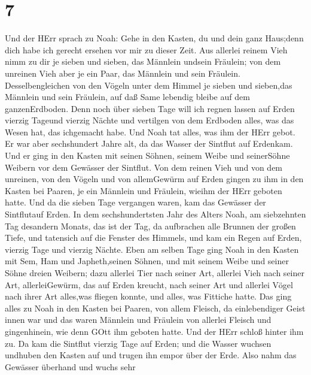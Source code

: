 \hypertarget{section-6}{%
\section{7}\label{section-6}}

 Und der HErr sprach zu Noah: Gehe in den Kasten, du und
dein ganz Haus;denn dich habe ich gerecht ersehen vor mir zu dieser
Zeit.  Aus allerlei reinem Vieh nimm zu dir je sieben und
sieben, das Männlein undsein Fräulein; von dem unreinen Vieh aber je ein
Paar, das Männlein und sein Fräulein.  Desselbengleichen von
den Vögeln unter dem Himmel je sieben und sieben,das Männlein und sein
Fräulein, auf daß Same lebendig bleibe auf dem ganzenErdboden.
 Denn noch über sieben Tage will ich regnen lassen auf Erden
vierzig Tageund vierzig Nächte und vertilgen von dem Erdboden alles, was
das Wesen hat, das ichgemacht habe.  Und Noah tat alles, was
ihm der HErr gebot.  Er war aber sechshundert Jahre alt, da
das Wasser der Sintflut auf Erdenkam.  Und er ging in den
Kasten mit seinen Söhnen, seinem Weibe und seinerSöhne Weibern vor dem
Gewässer der Sintflut.  Von dem reinen Vieh und von dem
unreinen, von den Vögeln und von allemGewürm auf Erden 
gingen zu ihm in den Kasten bei Paaren, je ein Männlein und Fräulein,
wieihm der HErr geboten hatte.  Und da die sieben Tage
vergangen waren, kam das Gewässer der Sintflutauf Erden. 
In dem sechshundertsten Jahr des Alters Noah, am siebzehnten Tag
desandern Monats, das ist der Tag, da aufbrachen alle Brunnen der großen
Tiefe, und tatensich auf die Fenster des Himmels,  und kam
ein Regen auf Erden, vierzig Tage und vierzig Nächte.  Eben
am selben Tage ging Noah in den Kasten mit Sem, Ham und Japheth,seinen
Söhnen, und mit seinem Weibe und seiner Söhne dreien Weibern;
 dazu allerlei Tier nach seiner Art, allerlei Vieh nach
seiner Art, allerleiGewürm, das auf Erden kreucht, nach seiner Art und
allerlei Vögel nach ihrer Art alles,was fliegen konnte, und alles, was
Fittiche hatte.  Das ging alles zu Noah in den Kasten bei
Paaren, von allem Fleisch, da einlebendiger Geist innen war
 und das waren Männlein und Fräulein von allerlei Fleisch
und gingenhinein, wie denn GOtt ihm geboten hatte. Und der HErr schloß
hinter ihm zu.  Da kam die Sintflut vierzig Tage auf Erden;
und die Wasser wuchsen undhuben den Kasten auf und trugen ihn empor über
der Erde.  Also nahm das Gewässer überhand und wuchs sehr
